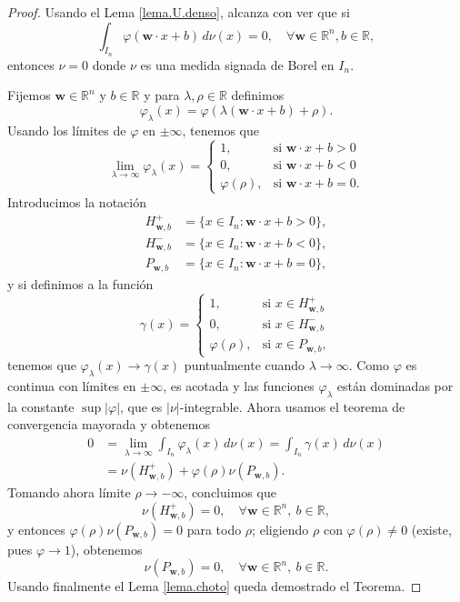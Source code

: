 \documentclass[12pt, a4paper]{amsbook}
\newcommand{\R}{{\mathbb R}}
\newcommand{\ww}{{\mathbf w}}
\theoremstyle{remark}
\theoremstyle{definition}
\numberwithin{section}{chapter}
\numberwithin{subsection}{section}
\numberwithin{equation}{section}
\numberwithin{figure}{chapter}
\begin{document}
\begin{proof}
Usando el Lema \ref{lema.U.denso}, alcanza con ver que si
$$
\int_{I_n} \varphi(\ww\cdot x + b)\, d\nu(x) = 0,\quad \forall \ww\in\R^n, b\in\R,
$$
entonces $\nu=0$ donde $\nu$ es una medida signada de Borel en $I_n$.

Fijemos $\ww\in\R^n$ y $b\in \R$ y para $\lambda, \rho\in\R$ definimos
$$
\varphi_{\lambda}(x) = \varphi(\lambda(\ww\cdot x + b) + \rho).
$$
Usando los límites de $\varphi$ en $\pm\infty$, tenemos que
$$
\lim_{\lambda\to\infty} \varphi_\lambda(x) = \begin{cases}
1, & \text{si } \ww\cdot x + b>0\\
0, & \text{si } \ww\cdot x + b<0\\
\varphi(\rho), & \text{si } \ww\cdot x + b = 0.
\end{cases}
$$ 
Introducimos la notación
\begin{align*}
H_{\ww,b}^+ &= \{x\in I_n\colon  \ww\cdot x + b>0\},\\ 
H_{\ww,b}^- &= \{x\in I_n\colon  \ww\cdot x + b<0\},\\
P_{\ww,b} &= \{x\in I_n\colon  \ww\cdot x + b=0\},
\end{align*}
y si definimos a la función
$$
\gamma(x) =  \begin{cases}
1, & \text{si } x\in H_{\ww,b}^+\\
0, & \text{si } x\in H_{\ww,b}^-\\
\varphi(\rho), & \text{si } x\in P_{\ww,b},
\end{cases}
$$
tenemos que $\varphi_\lambda(x)\to \gamma(x)$ puntualmente cuando $\lambda\to\infty$. Como $\varphi$ es continua con límites en $\pm\infty$, es acotada y las funciones $\varphi_\lambda$ están dominadas por la constante $\sup|\varphi|$, que es $|\nu|$-integrable. Ahora usamos el teorema de convergencia mayorada y obtenemos
\begin{align*}
0 &= \lim_{\lambda\to\infty} \int_{I_n} \varphi_\lambda(x)\, d\nu(x) = \int_{I_n} \gamma(x)\, d\nu(x)\\
&= \nu(H_{\ww,b}^+) + \varphi(\rho)\nu(P_{\ww, b}).
\end{align*}
Tomando ahora límite $\rho\to-\infty$, concluimos que 
$$
\nu(H_{\ww,b}^+)=0,\quad \forall \ww\in\R^n,\ b\in\R,
$$
y entonces $\varphi(\rho)\nu(P_{\ww,b})=0$ para todo $\rho$; eligiendo $\rho$ con $\varphi(\rho)\neq0$ (existe, pues $\varphi\to1$), obtenemos
$$
\nu(P_{\ww, b})=0,\quad \forall \ww\in\R^n,\ b\in\R.
$$
Usando finalmente el Lema \ref{lema.choto} queda demostrado el Teorema.
\end{proof}
\end{document}
